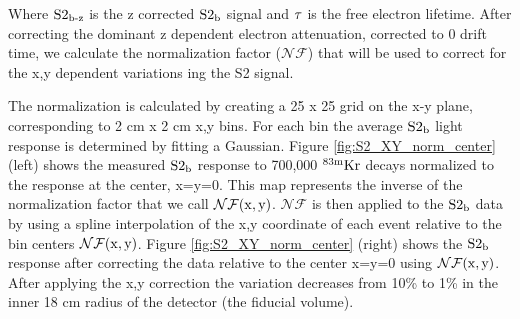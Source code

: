 \noindent Where $\rm S2_{\operatorname{b-z}}$ is the z corrected $\rm S2_b$ signal and $\rm \tau$ is the free electron lifetime. After correcting the dominant z dependent electron attenuation, corrected to 0 drift time, we calculate the normalization factor ($\mathcal{NF}$) that will be used to correct for the x,y dependent variations ing the S2 signal.

The normalization is calculated by creating a 25 x 25 grid on the x-y plane, corresponding to 2 cm x 2 cm x,y bins. For each bin the average $\rm S2_b$ light response is determined by fitting a Gaussian. Figure \ref{fig:S2_XY_norm_center} (left) shows the measured $\rm S2_b$ response to 700,000 $\rm^{83m}Kr$ decays normalized to the response at the center, x=y=0. This map represents the inverse of the normalization factor that we call $\rm\mathcal{NF}(x,y)$. $\mathcal{NF}$ is then applied to the $\rm S2_b$ data by using a spline interpolation of the x,y coordinate of each event relative to the bin centers $\rm\mathcal{NF}(x,y)$. Figure \ref{fig:S2_XY_norm_center} (right) shows the $\rm S2_b$ response after correcting the data relative to the center x=y=0 using $\rm\mathcal{NF}(x,y)$. After applying the x,y correction the variation decreases from 10\% to 1\% in the inner 18 cm radius of the detector (the fiducial volume).


